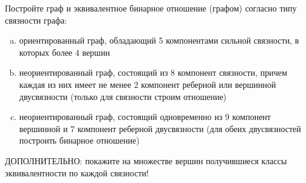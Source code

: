 \question 
Постройте граф и эквивалентное бинарное отношение (графом) согласно типу связности графа:\\
\begin{enumerate} [a)]\setcounter{enumi}{0}
\item ориентированный граф, обладающий 5 компонентами сильной связности, в которых более 4 вершин
\item неориентированный граф, состоящий из 8 компонент связности, причем каждая из них имеет не менее 2 компонент реберной или вершинной двусвязности (только для связности строим отношение)
\item неориентированный граф, состоящий одновременно из 9 компонент вершинной и 7 компонент реберной двусвязности (для обеих двусвязностей построить бинарное отношение)
\end{enumerate} 
ДОПОЛНИТЕЛЬНО: покажите на множестве вершин получившиеся классы эквивалентности по каждой связности!